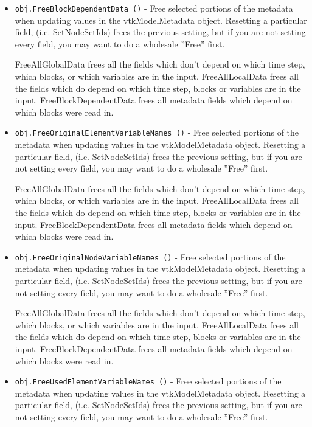 \begin{itemize}
\item  \verb|obj.FreeBlockDependentData ()| -    Free selected portions of the metadata when updating values
   in the vtkModelMetadata object.  Resetting a particular field,
   (i.e. SetNodeSetIds) frees the previous setting, but if you
   are not setting every field, you may want to do a wholesale
   ''Free'' first.

   FreeAllGlobalData frees all the fields which don't depend on
     which time step, which blocks, or which variables are in the input.
   FreeAllLocalData frees all the fields which do depend on which
     time step, blocks or variables are in the input.
   FreeBlockDependentData frees all metadata fields which depend on
     which blocks were read in.

\item  \verb|obj.FreeOriginalElementVariableNames ()| -    Free selected portions of the metadata when updating values
   in the vtkModelMetadata object.  Resetting a particular field,
   (i.e. SetNodeSetIds) frees the previous setting, but if you
   are not setting every field, you may want to do a wholesale
   ''Free'' first.

   FreeAllGlobalData frees all the fields which don't depend on
     which time step, which blocks, or which variables are in the input.
   FreeAllLocalData frees all the fields which do depend on which
     time step, blocks or variables are in the input.
   FreeBlockDependentData frees all metadata fields which depend on
     which blocks were read in.

\item  \verb|obj.FreeOriginalNodeVariableNames ()| -    Free selected portions of the metadata when updating values
   in the vtkModelMetadata object.  Resetting a particular field,
   (i.e. SetNodeSetIds) frees the previous setting, but if you
   are not setting every field, you may want to do a wholesale
   ''Free'' first.

   FreeAllGlobalData frees all the fields which don't depend on
     which time step, which blocks, or which variables are in the input.
   FreeAllLocalData frees all the fields which do depend on which
     time step, blocks or variables are in the input.
   FreeBlockDependentData frees all metadata fields which depend on
     which blocks were read in.

\item  \verb|obj.FreeUsedElementVariableNames ()| -    Free selected portions of the metadata when updating values
   in the vtkModelMetadata object.  Resetting a particular field,
   (i.e. SetNodeSetIds) frees the previous setting, but if you
   are not setting every field, you may want to do a wholesale
   ''Free'' first.


\end{itemize}
